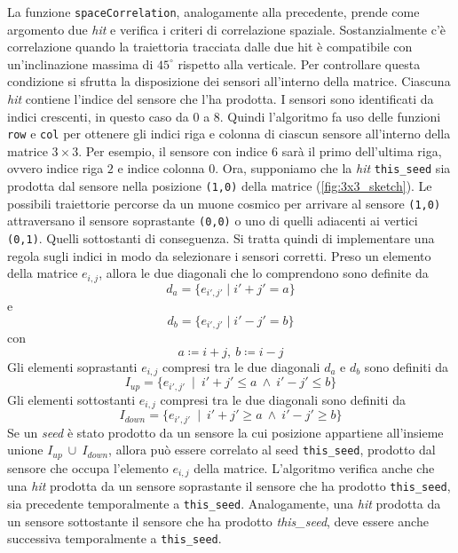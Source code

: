 \documentclass[../main.tex]{subfiles}
\begin{document}
La funzione \texttt{spaceCorrelation}, analogamente alla precedente, prende come argomento due \emph{hit} e verifica i criteri di correlazione spaziale.
Sostanzialmente c'è correlazione quando la traiettoria tracciata dalle due hit è compatibile con un'inclinazione massima di $45^\circ$ rispetto alla verticale. Per controllare questa condizione si sfrutta la disposizione dei sensori all'interno della matrice.
Ciascuna \emph{hit} contiene l'indice del sensore che l'ha prodotta. I sensori sono identificati da indici crescenti, in questo caso da $0$ a $8$. Quindi l'algoritmo fa uso delle funzioni \texttt{row} e \texttt{col} per ottenere gli indici riga e colonna di ciascun sensore all'interno della matrice $3 \times 3$. Per esempio, il sensore con indice $6$ sarà il primo dell'ultima riga, ovvero indice riga $2$ e indice colonna $0$.
Ora, supponiamo che la \emph{hit} \texttt{this\_seed} sia prodotta dal sensore nella posizione \texttt{(1,0)} della matrice (\autoref{fig:3x3_sketch}). Le possibili traiettorie percorse da un muone cosmico per arrivare al sensore \texttt{(1,0)} attraversano il sensore soprastante \texttt{(0,0)} o uno di quelli adiacenti ai vertici \texttt{(0,1)}. Quelli sottostanti di conseguenza. 
Si tratta quindi di implementare una regola sugli indici in modo da selezionare i sensori corretti. Preso un elemento della matrice $e_{i,j}$, allora le due diagonali che lo comprendono sono definite da
\begin{equation}
	d_a = \{ e_{i',j'} \mid i' + j' = a\}
\end{equation}
e 
\begin{equation}
	d_b = \{ e_{i',j'} \mid i' - j' = b\}
\end{equation}
con 
\begin{equation}
a \coloneqq i + j \mathrm{,}\ b \coloneqq i - j
\end{equation}
Gli elementi soprastanti $e_{i,j}$ compresi tra le due diagonali $d_a$ e $d_b$ sono definiti da
\begin{equation}
	I_{up} = \{ e_{i',j'}\ \mid\ i' + j' \leq a\ \land\ i' - j' \leq b\}
\end{equation}
Gli elementi sottostanti $e_{i,j}$ compresi tra le due diagonali sono definiti da 
\begin{equation}
	I_{down} = \{ e_{i',j'}\ \mid\ i' + j' \geq a\ \land\ i' - j' \geq b\}
\end{equation}
Se un \emph{seed} è stato prodotto da un sensore la cui posizione appartiene all'insieme unione $I_{up}\ \cup\ I_{down}$, allora può essere correlato al seed \texttt{this\_seed}, prodotto dal sensore che occupa l'elemento $e_{i,j}$ della matrice.
L'algoritmo verifica anche che una \emph{hit} prodotta da un sensore soprastante il sensore che ha prodotto \texttt{this\_seed}, sia precedente temporalmente a \texttt{this\_seed}. Analogamente, una \emph{hit} prodotta da un sensore sottostante il sensore che ha prodotto \emph{this\_seed}, deve essere anche successiva temporalmente a \texttt{this\_seed}.
\end{document}
